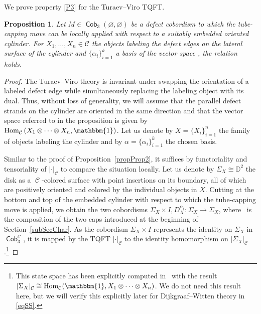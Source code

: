\documentclass[pdftex]{sigma}
\DeclareMathOperator{\Hom}{Hom}
\DeclareMathOperator{\Cob}{\mathsf{Cob}}
\DeclareMathOperator{\calc}{\mathcal{C}}
\numberwithin{equation}{section}
\newtheorem{Proposition}[Proposition]{Proposition}
\theoremstyle{definition}
\begin{document}
We prove property \ref{P3} for the Turaev--Viro TQFT.
\begin{Proposition}
 \label{propProp3TV}
 Let $M \in \Cob_3(\varnothing, \varnothing)$ be a defect cobordism to which the tube-capping move can be locally applied with respect to a suitably embedded oriented cylinder. For $X_1, \dots, X_n \in \mathcal{C}$ the objects labeling the defect edges on the lateral surface of the cylinder and $\{\alpha_i\}_{i = 1}^k$ a basis of the vector space \smash{$\Hom_{\calc}\bigl(X_1^{\varepsilon(1)} \otimes \dots \otimes X_n^{\varepsilon(n)}, \mathbbm{1}\bigr) $}, the relation \smash{$|M|_{\calc} = \sum_{i = 1}^k|\Delta_3^{\alpha_i}(M)|_{\calc}$} holds.
\end{Proposition}
\begin{proof}
 The Turaev--Viro theory is invariant under swapping the orientation of a labeled defect edge while simultaneously replacing the labeling object with its dual. Thus, without loss of generality, we will assume that the parallel defect strands on the cylinder are oriented in the same direction and that the vector space referred to in the proposition is given by $\Hom_{\calc}\left(X_1 \otimes \dots \otimes X_n, \mathbbm{1}\right)$. Let us denote by $X = \{X_i\}_{i = 1}^n$ the family of objects labeling the cylinder and by $\alpha = \{\alpha_i\}_{i = 1}^k$ the chosen basis.

 Similar to the proof of Proposition~\ref{propProp2}, it suffices by functoriality and tensoriality of $|\cdot|_{\calc}$ to compare the situation locally. Let us denote by $\Sigma_X \cong \mathbb{D}^2$ the disk as a $\calc$-colored surface with point insertions on its boundary, all of which are positively oriented and colored by the individual objects in $X$. Cutting at the bottom and top of the embedded cylinder with respect to which the tube-capping move is applied, we obtain the two cobordisms $\Sigma_X \times I, D_X^{\alpha_i}\colon \Sigma_X \rightarrow \Sigma_X$, where~ is the composition  of the two caps introduced at the beginning of Section~\ref{subSecChar}.
 As the cobordism $\Sigma_X \times I$ represents the identity on $\Sigma_X$ in $\Cob_3^{\calc}$, it is mapped by the TQFT $|\cdot |_{\calc}$ to the identity homomorphism on $|\Sigma_X|_{\calc}$.\footnote{This state space has been explicitly computed in~\cite{F} with the result $|\Sigma_X|_{\calc} \cong \Hom_{\calc} (\mathbbm{1}, X_1 \otimes \dots \otimes X_n )$. We do not need this result here, but we will verify this explicitly later for Dijkgraaf--Witten theory in \eqref{eqSS}.}


\end{proof}
\end{document}

